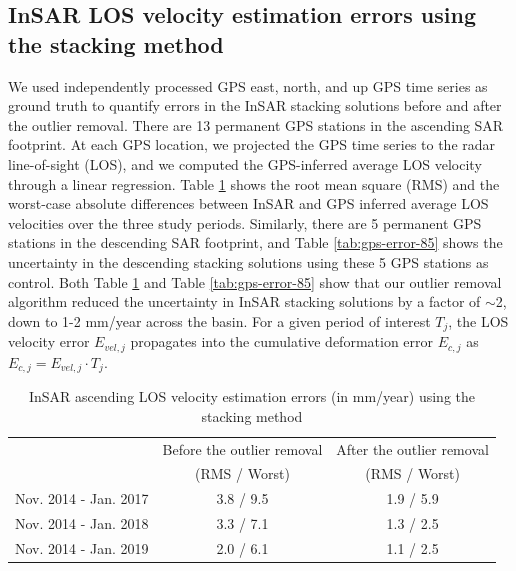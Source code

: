 \subsection{InSAR LOS velocity estimation errors using the stacking method}
\label{sec:error-quant}
We used independently processed GPS east, north, and up GPS time series as ground truth to quantify errors in the InSAR stacking solutions before and after the outlier removal. There are 13 permanent GPS stations in the ascending SAR footprint. At each GPS location, we projected the GPS time series to the radar line-of-sight (LOS), and we computed the GPS-inferred average LOS velocity through a linear regression. Table \ref{tab:gps-error-78} shows the root mean square (RMS) and the worst-case absolute differences between InSAR and GPS inferred average LOS velocities over the three study periods. Similarly, there are 5 permanent GPS stations in the descending SAR footprint, and Table \ref{tab:gps-error-85} shows the uncertainty in the descending stacking solutions using these 5 GPS stations as control. Both Table \ref{tab:gps-error-78} and Table \ref{tab:gps-error-85} show that our outlier removal algorithm reduced the uncertainty in InSAR stacking solutions by a factor of $\sim$2, down to 1-2 mm/year across the basin. For a given period of interest $T_j$, the LOS velocity error $ E_{vel,j} $ propagates into the cumulative deformation error $ E_{c, j} $ as $ E_{c,j} = E_{vel,j} \cdot T_j $. 


\begin{table}
	\caption{InSAR ascending LOS velocity estimation errors (in mm/year) using the stacking method}
	\centering
	\begin{tabular}{|c|c|c|}
		\hline 
		& Before the outlier removal & After the outlier removal \\
		& (RMS / Worst) & (RMS / Worst) \\
		\hline
		Nov. 2014 - Jan. 2017 & 3.8 / 9.5         & 1.9 / 5.9       \\\hline
		Nov. 2014 - Jan. 2018 & 3.3 / 7.1         & 1.3 / 2.5       \\\hline
		Nov. 2014 - Jan. 2019 & 2.0 / 6.1         & 1.1 / 2.5       \\\hline                
	\end{tabular}
	\label{tab:gps-error-78}
\end{table}


